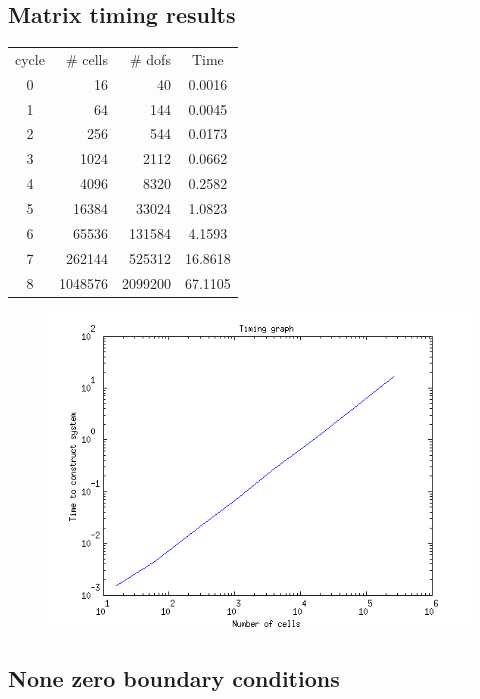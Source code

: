 \documentclass[14pt]{extarticle}
\numberwithin{equation}{section}    %
\begin{document}
\subsection{Matrix timing results}

\begin{table}[H]
\begin{center}
\begin{tabular}{|c|r|r|c|} \hline
cycle & \# cells & \# dofs & Time\\
0 & 16 & 40 & 0.0016\\
1 & 64 & 144 & 0.0045\\
2 & 256 & 544 & 0.0173\\
3 & 1024 & 2112 & 0.0662\\
4 & 4096 & 8320 & 0.2582\\
5 & 16384 & 33024 & 1.0823\\
6 & 65536 & 131584 & 4.1593\\
7 & 262144 & 525312 & 16.8618\\
8 & 1048576 & 2099200 & 67.1105\\ \hline
\end{tabular}
\end{center}
\end{table}


\begin{figure}[h!]
\centering
\includegraphics[width=15cm]{TimingsPlot}
\end{figure}
 \subsection{None zero boundary conditions}
%









\end{document}
